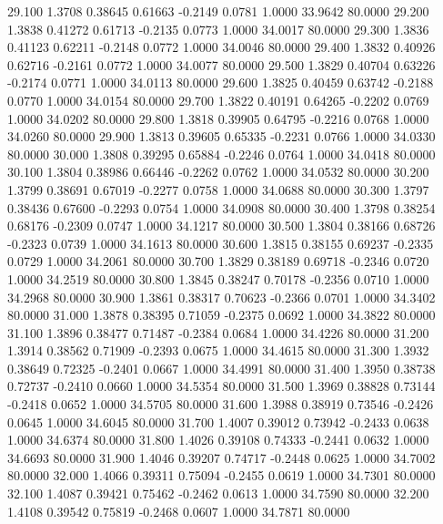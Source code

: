   29.100   1.3708   0.38645   0.61663  -0.2149   0.0781   1.0000  33.9642  80.0000
  29.200   1.3838   0.41272   0.61713  -0.2135   0.0773   1.0000  34.0017  80.0000
  29.300   1.3836   0.41123   0.62211  -0.2148   0.0772   1.0000  34.0046  80.0000
  29.400   1.3832   0.40926   0.62716  -0.2161   0.0772   1.0000  34.0077  80.0000
  29.500   1.3829   0.40704   0.63226  -0.2174   0.0771   1.0000  34.0113  80.0000
  29.600   1.3825   0.40459   0.63742  -0.2188   0.0770   1.0000  34.0154  80.0000
  29.700   1.3822   0.40191   0.64265  -0.2202   0.0769   1.0000  34.0202  80.0000
  29.800   1.3818   0.39905   0.64795  -0.2216   0.0768   1.0000  34.0260  80.0000
  29.900   1.3813   0.39605   0.65335  -0.2231   0.0766   1.0000  34.0330  80.0000
  30.000   1.3808   0.39295   0.65884  -0.2246   0.0764   1.0000  34.0418  80.0000
  30.100   1.3804   0.38986   0.66446  -0.2262   0.0762   1.0000  34.0532  80.0000
  30.200   1.3799   0.38691   0.67019  -0.2277   0.0758   1.0000  34.0688  80.0000
  30.300   1.3797   0.38436   0.67600  -0.2293   0.0754   1.0000  34.0908  80.0000
  30.400   1.3798   0.38254   0.68176  -0.2309   0.0747   1.0000  34.1217  80.0000
  30.500   1.3804   0.38166   0.68726  -0.2323   0.0739   1.0000  34.1613  80.0000
  30.600   1.3815   0.38155   0.69237  -0.2335   0.0729   1.0000  34.2061  80.0000
  30.700   1.3829   0.38189   0.69718  -0.2346   0.0720   1.0000  34.2519  80.0000
  30.800   1.3845   0.38247   0.70178  -0.2356   0.0710   1.0000  34.2968  80.0000
  30.900   1.3861   0.38317   0.70623  -0.2366   0.0701   1.0000  34.3402  80.0000
  31.000   1.3878   0.38395   0.71059  -0.2375   0.0692   1.0000  34.3822  80.0000
  31.100   1.3896   0.38477   0.71487  -0.2384   0.0684   1.0000  34.4226  80.0000
  31.200   1.3914   0.38562   0.71909  -0.2393   0.0675   1.0000  34.4615  80.0000
  31.300   1.3932   0.38649   0.72325  -0.2401   0.0667   1.0000  34.4991  80.0000
  31.400   1.3950   0.38738   0.72737  -0.2410   0.0660   1.0000  34.5354  80.0000
  31.500   1.3969   0.38828   0.73144  -0.2418   0.0652   1.0000  34.5705  80.0000
  31.600   1.3988   0.38919   0.73546  -0.2426   0.0645   1.0000  34.6045  80.0000
  31.700   1.4007   0.39012   0.73942  -0.2433   0.0638   1.0000  34.6374  80.0000
  31.800   1.4026   0.39108   0.74333  -0.2441   0.0632   1.0000  34.6693  80.0000
  31.900   1.4046   0.39207   0.74717  -0.2448   0.0625   1.0000  34.7002  80.0000
  32.000   1.4066   0.39311   0.75094  -0.2455   0.0619   1.0000  34.7301  80.0000
  32.100   1.4087   0.39421   0.75462  -0.2462   0.0613   1.0000  34.7590  80.0000
  32.200   1.4108   0.39542   0.75819  -0.2468   0.0607   1.0000  34.7871  80.0000
